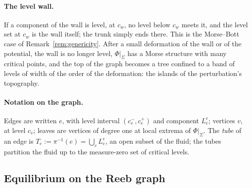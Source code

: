 \documentclass[11pt]{article}
\theoremstyle{definition}
\theoremstyle{remark}
\begin{document}
\paragraph{The level wall.} If a component of the wall is level, at
$c_w$, no level below $c_w$ meets it, and the level set at $c_w$ is
the wall itself; the trunk simply ends there. This is the Morse--Bott
case of Remark~\ref{rem:genericity}. After a small deformation of the
wall or of the potential, the wall is no longer level, $\Phi|_\Sigma$
has a Morse structure with many critical points, and the top of the
graph becomes a tree confined to a band of levels of width of the
order of the deformation: the islands of the perturbation's
topography.

\paragraph{Notation on the graph.} Edges are written $e$, with level
interval $(c_e^-, c_e^+)$ and component $L^e_c$; vertices $v$, at
level $c_v$; leaves are vertices of degree one at local extrema of
$\Phi|_\Sigma$. The \emph{tube} of an edge is $T_e := \pi^{-1}(e) =
\bigcup_cL^e_c$, an open subset of the fluid; the tubes partition the
fluid up to the measure-zero set of critical levels.

\subsection{Equilibrium on the Reeb graph}
\label{sec:exactgraph}
\label{sec:profiles}
\end{document}
